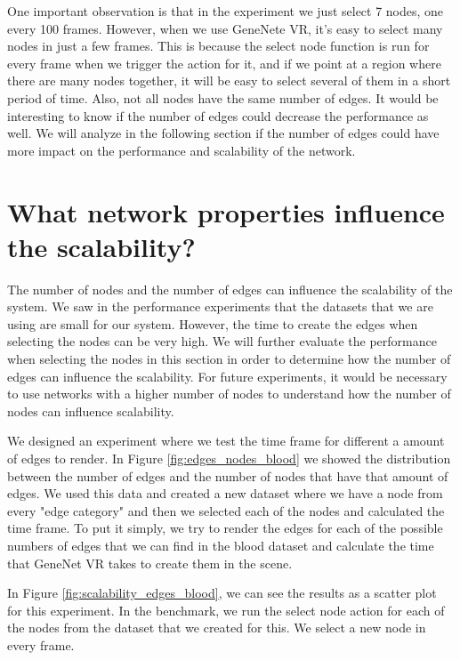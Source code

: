 One important observation is that in the experiment we just select 7 nodes, one every 100 frames. However, when we use GeneNete VR, it's easy to select many nodes in just a few frames. This is because the select node function is run for every frame when we trigger the action for it, and if we point at a region where there are many nodes together, it will be easy to select several of them in a short period of time. Also, not all nodes have the same number of edges. It would be interesting to know if the number of edges could decrease the performance as well. We will analyze in the following section if the number of edges could have more impact on the performance and scalability of the network.

\section{What network properties influence the scalability?}

The number of nodes and the number of edges can influence the scalability of the system. We saw in the performance experiments that the datasets that we are using are small for our system. However, the time to create the edges when selecting the nodes can be very high. We will further evaluate the performance when selecting the nodes in this section in order to determine how the number of edges can influence the scalability. For future experiments, it would be necessary to use networks with a higher number of nodes to understand how the number of nodes can influence scalability.

We designed an experiment where we test the time frame for different a amount of edges to render. In Figure \ref{fig:edges_nodes_blood} we showed the distribution between the number of edges and the number of nodes that have that amount of edges. We used this data and created a new dataset where we have a node from every "edge category" and then we selected each of the nodes and calculated the time frame. To put it simply, we try to render the edges for each of the possible numbers of edges that we can find in the blood dataset and calculate the time that GeneNet VR takes to create them in the scene.

In Figure \ref{fig:scalability_edges_blood}, we can see the results as a scatter plot for this experiment. In the benchmark, we run the select node action for each of the nodes from the dataset that we created for this. We select a new node in every frame.

